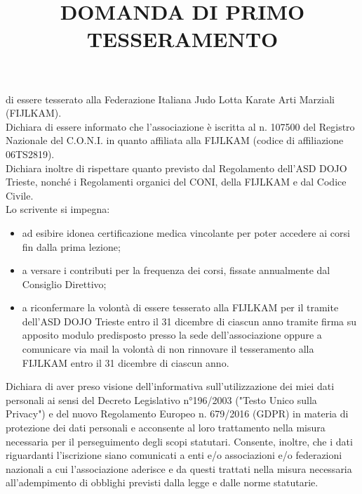 \documentclass[
	headerstyle = TitleDojoFijlkam
]{djtsmod}
\title{DOMANDA DI PRIMO TESSERAMENTO}
\begin{document}
	\maketitle
	

	\basedata
	
	di essere tesserato alla Federazione Italiana Judo Lotta Karate Arti Marziali (FIJLKAM). \\[10pt]
	Dichiara di essere informato che l’associazione è iscritta al n. 107500 del Registro Nazionale del C.O.N.I. in quanto affiliata alla FIJLKAM (codice di affiliazione 06TS2819). \\[10pt]
	Dichiara inoltre di rispettare quanto previsto dal Regolamento dell'ASD DOJO Trieste, nonché i Regolamenti organici del CONI, della FIJLKAM e dal Codice Civile. \\
	Lo scrivente si impegna:
	\begin{itemize}
		\item ad esibire idonea certificazione medica vincolante per poter accedere ai corsi fin dalla prima lezione;
		\item a versare i contributi per la frequenza dei corsi, fissate annualmente dal Consiglio Direttivo;
		\item a riconfermare la volontà di essere tesserato alla FIJLKAM per il tramite dell'ASD DOJO Trieste entro il 31 dicembre di ciascun anno tramite firma su apposito modulo predisposto presso la sede dell'associazione oppure a comunicare via mail la volontà di non rinnovare il tesseramento alla FIJLKAM entro il 31 dicembre di ciascun anno.
	\end{itemize}
	Dichiara di aver preso visione dell'informativa sull'utilizzazione dei miei dati personali ai sensi del Decreto Legislativo n°196/2003 ("Testo Unico sulla Privacy") e del nuovo Regolamento Europeo n. 679/2016 (GDPR) in materia di protezione dei dati personali e acconsente al loro trattamento nella misura necessaria per il perseguimento degli scopi statutari. Consente, inoltre, che i dati riguardanti l’iscrizione siano comunicati a enti e/o associazioni e/o federazioni nazionali a cui l’associazione aderisce e da questi trattati nella misura necessaria all'adempimento di obblighi previsti dalla legge e dalle norme statutarie.
	
	\vspace{0.5in}
	
\end{document}
